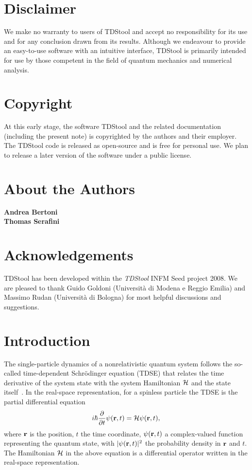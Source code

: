 \documentclass[a4paper,11pt]{article}
\begin{document}
\section*{Disclaimer}
We make no warranty to users of TDStool and accept no responsibility for
its use and for any conclusion drawn from its results.  Although we endeavour
to provide an easy-to-use software with an intuitive interface, TDStool is
primarily intended for use by those competent in the field of quantum mechanics
and numerical analysis.

\section*{Copyright}
At this early stage, the software TDStool and the related documentation
(including the present note) is copyrighted by the authors and their
employer.  The TDStool code is released as open-source and is free for
personal use.  We plan to release a later version of the software under
a public license.


\section*{About the Authors}

{\bf Andrea Bertoni} %
\\
{\bf Thomas Serafini} %

\section*{Acknowledgements}
TDStool has been developed within the \emph{TDStool} INFM Seed project 2008.
We are pleased to thank Guido Goldoni (Universit\`a di Modena e Reggio Emilia)
and Massimo Rudan (Universit\`a di Bologna) for most helpful discussions and
suggestions.

\newpage

\tableofcontents

\newpage

\pagestyle{fancy}


\section{Introduction}
The single-particle dynamics of a nonrelativistic quantum system follows
the so-called time-dependent Schr\"odinger equation (TDSE) that relates the time derivative
of the system state with the system Hamiltonian ${\cal H}$ and the state itself~\cite{messiahBOOK}.
In the real-space representation, for a spinless particle the TDSE is the partial differential equation 
\begin{equation} \label{tdse1}
i\hbar\frac{\partial}{\partial t}\psi({\bf r},t)= {\cal H} \psi({\bf r},t),
\end{equation}
where ${\bf r}$ is the position, $t$ the time coordinate, $\psi({\bf r},t)$ a complex-valued
function representing the quantum state, with $|\psi({\bf r},t)|^2$ the probability density in
${\bf r}$ and $t$.  The Hamiltonian ${\cal H}$ in the above
equation is a differential operator written in the real-space representation.
\end{document}
